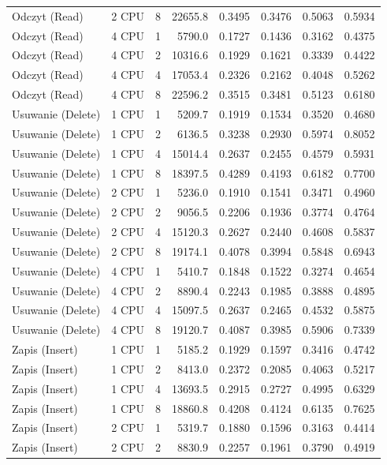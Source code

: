 \begin{table}[ht]
{\begin{tabular}{llcrrrrr}
Odczyt (Read) & 2 CPU & 8 & 22655.8 & 0.3495 & 0.3476 & 0.5063 & 0.5934 \\
Odczyt (Read) & 4 CPU & 1 & 5790.0 & 0.1727 & 0.1436 & 0.3162 & 0.4375 \\
Odczyt (Read) & 4 CPU & 2 & 10316.6 & 0.1929 & 0.1621 & 0.3339 & 0.4422 \\
Odczyt (Read) & 4 CPU & 4 & 17053.4 & 0.2326 & 0.2162 & 0.4048 & 0.5262 \\
Odczyt (Read) & 4 CPU & 8 & 22596.2 & 0.3515 & 0.3481 & 0.5123 & 0.6180 \\
Usuwanie (Delete) & 1 CPU & 1 & 5209.7 & 0.1919 & 0.1534 & 0.3520 & 0.4680 \\
Usuwanie (Delete) & 1 CPU & 2 & 6136.5 & 0.3238 & 0.2930 & 0.5974 & 0.8052 \\
Usuwanie (Delete) & 1 CPU & 4 & 15014.4 & 0.2637 & 0.2455 & 0.4579 & 0.5931 \\
Usuwanie (Delete) & 1 CPU & 8 & 18397.5 & 0.4289 & 0.4193 & 0.6182 & 0.7700 \\
Usuwanie (Delete) & 2 CPU & 1 & 5236.0 & 0.1910 & 0.1541 & 0.3471 & 0.4960 \\
Usuwanie (Delete) & 2 CPU & 2 & 9056.5 & 0.2206 & 0.1936 & 0.3774 & 0.4764 \\
Usuwanie (Delete) & 2 CPU & 4 & 15120.3 & 0.2627 & 0.2440 & 0.4608 & 0.5837 \\
Usuwanie (Delete) & 2 CPU & 8 & 19174.1 & 0.4078 & 0.3994 & 0.5848 & 0.6943 \\
Usuwanie (Delete) & 4 CPU & 1 & 5410.7 & 0.1848 & 0.1522 & 0.3274 & 0.4654 \\
Usuwanie (Delete) & 4 CPU & 2 & 8890.4 & 0.2243 & 0.1985 & 0.3888 & 0.4895 \\
Usuwanie (Delete) & 4 CPU & 4 & 15097.5 & 0.2637 & 0.2465 & 0.4532 & 0.5875 \\
Usuwanie (Delete) & 4 CPU & 8 & 19120.7 & 0.4087 & 0.3985 & 0.5906 & 0.7339 \\
Zapis (Insert) & 1 CPU & 1 & 5185.2 & 0.1929 & 0.1597 & 0.3416 & 0.4742 \\
Zapis (Insert) & 1 CPU & 2 & 8413.0 & 0.2372 & 0.2085 & 0.4063 & 0.5217 \\
Zapis (Insert) & 1 CPU & 4 & 13693.5 & 0.2915 & 0.2727 & 0.4995 & 0.6329 \\
Zapis (Insert) & 1 CPU & 8 & 18860.8 & 0.4208 & 0.4124 & 0.6135 & 0.7625 \\
Zapis (Insert) & 2 CPU & 1 & 5319.7 & 0.1880 & 0.1596 & 0.3163 & 0.4414 \\
Zapis (Insert) & 2 CPU & 2 & 8830.9 & 0.2257 & 0.1961 & 0.3790 & 0.4919 \\

\end{tabular}}
\end{table}
